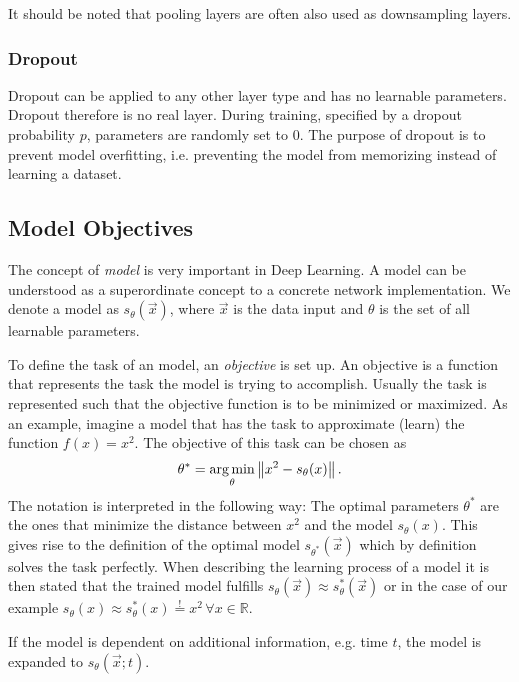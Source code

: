 It should be noted that pooling layers are often also used as downsampling layers.
%
\subsubsection{Dropout }
Dropout can be applied to any other layer type and has no learnable parameters. Dropout therefore is no real layer. During training, specified by a dropout probability $p$, parameters are randomly set to $0$. The purpose of dropout is to prevent model overfitting, i.e. preventing the model from memorizing instead of learning a dataset.
%
\subsection{Model Objectives}
The concept of \textit{model} is very important in Deep Learning. A model can be understood as a superordinate concept to a concrete network implementation. We denote a model as $s_\theta(\vec{x})$, where $\vec{x}$ is the data input and $\theta$ is the set of all learnable parameters.

To define the task of an model, an \textit{objective} is set up. An objective is a function that represents the task the model is trying to accomplish. Usually the task is represented such that the objective function is to be minimized or maximized. As an example, imagine a model that has the task to approximate (learn) the function $f(x)=x^2$. The objective of this task can be chosen as
%
\begin{equation} 
    \theta^*=\underset{\theta}{\arg \min}\left\lVert x^2-s_\theta(x)\right\rVert.
\end{equation}
%
The notation is interpreted in the following way: The optimal parameters $\theta^*$ are the ones that minimize the distance between $x^2$ and the model $s_\theta(x)$. This gives rise to the definition of the optimal model $s_{\theta^*}(\vec{x})$ which by definition solves the task perfectly. When describing the learning process of a model it is then stated that the trained model fulfills $s_\theta(\vec{x})\approx s_{\theta}^*(\vec{x})$ or in the case of our example $s_\theta(x)\approx s_{\theta}^*(x)\overset{!}{=}x^2\,\forall x\in\mathbb{R}$.

If the model is dependent on additional information, e.g. time $t$, the model is expanded to $s_\theta(\vec{x}; t)$. 
%

